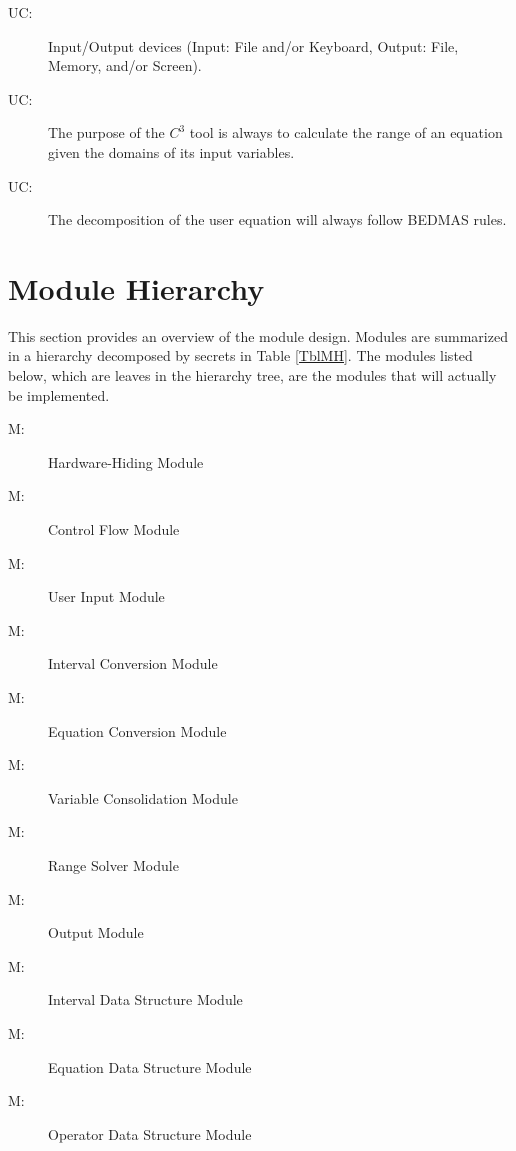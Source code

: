 \documentclass[12pt, titlepage]{article}
\newcounter{ucnum}
\newcommand{\uctheucnum}{UC\theucnum}
\newcounter{mnum}
\newcommand{\mthemnum}{M\themnum}
\newcommand{\prognameAbbrv}{$C^{3}$}
\begin{document}
\begin{description}
\item[ \uctheucnum \label{ucIO}:] Input/Output devices
  (Input: File and/or Keyboard, Output: File, Memory, and/or Screen).

\item[ \uctheucnum \label{ucPurpose}:] The purpose of the 
\prognameAbbrv{} tool is always to calculate the range of an equation given the 
domains of its input variables.

\item[ \uctheucnum \label{ucDecomposing}:] The 
decomposition of the user equation will always follow BEDMAS rules.

\end{description}

\newpage

\section{Module Hierarchy} 
\label{SecMH}
This section provides an overview of the module design. Modules are summarized
in a hierarchy decomposed by secrets in Table \ref{TblMH}. The modules listed
below, which are leaves in the hierarchy tree, are the modules that will
actually be implemented.

\begin{description}
\item [ \mthemnum \label{mHH}:] Hardware-Hiding Module

\item [ \mthemnum \label{mCF}:] Control Flow Module

\item [ \mthemnum \label{mUI}:] User Input Module

\item [ \mthemnum \label{mIC}:] Interval Conversion Module

\item [ \mthemnum \label{mEC}:] Equation Conversion Module

\item [ \mthemnum \label{mVC}:] Variable Consolidation 
Module

\item [ \mthemnum \label{mRS}:] Range Solver Module

\item [ \mthemnum \label{mO}:] Output Module

\item [ \mthemnum \label{mIDS}:] Interval Data Structure 
Module

\item [ \mthemnum \label{mEDS}:] Equation Data Structure 
Module

\item [ \mthemnum \label{mODS}:] Operator Data Structure 
Module

\end{description}
\end{document}
